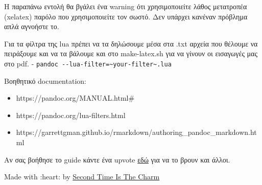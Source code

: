 Η παραπάνω εντολή θα βγάλει ένα warning ότι χρησιμοποιείτε λάθος
μετατροπέα (xelatex) παρόλο που χρησιμοποιείτε τον σωστό. Δεν υπάρχει
κανέναν πρόβλημα απλά αγνοήστε το.

Για τα φίλτρα της lua πρέπει να τα δηλώσουμε μέσα στα .txt αρχεία που
θέλουμε να πειράξουμε και να τα βάλουμε και στο make-latex.sh για να
γίνουν οι εισαγωγές μας στο pdf. -
\texttt{pandoc\ -\/-lua-filter=\textasciitilde{}your-filter\textasciitilde{}.lua}

Βοηθητικό documentation:

\begin{itemize}
\item
  https://pandoc.org/MANUAL.html\#
\item
  https://pandoc.org/lua-filters.html
\item
  https://garrettgman.github.io/rmarkdown/authoring\_pandoc\_markdown.html
\end{itemize}

Αν σας βοήθησε το guide κάντε ένα upvote
\href{https://github.com/courses-ionio/help/discussions/1151}{εδώ} για
να το βρουν και άλλοι.

Made with :heart: by
\href{https://github.com/Second-Time-Is-The-Charm/}{Second Time Is The
Charm}
